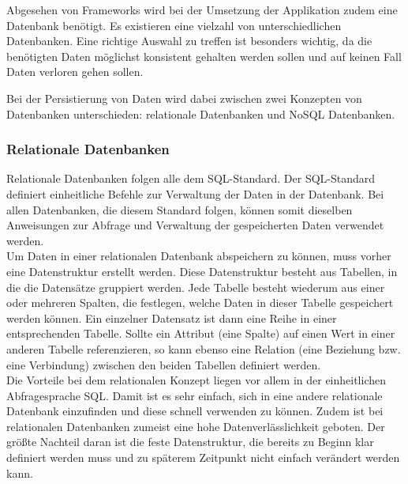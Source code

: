
Abgesehen von Frameworks wird bei der Umsetzung der Applikation zudem eine Datenbank benötigt. Es existieren eine vielzahl von unterschiedlichen Datenbanken. Eine richtige Auswahl zu treffen ist besonders wichtig, da die benötigten Daten möglichst konsistent gehalten werden sollen und auf keinen Fall Daten verloren gehen sollen. 

Bei der Persistierung von Daten wird dabei zwischen zwei Konzepten von Datenbanken unterschieden: relationale Datenbanken und NoSQL Datenbanken. \cite{DATENRELNOSQL}

\subsubsection{Relationale Datenbanken}
Relationale Datenbanken folgen alle dem SQL-Standard. Der SQL-Standard definiert einheitliche Befehle zur Verwaltung der Daten in der Datenbank. Bei allen Datenbanken, die diesem Standard folgen, können somit dieselben Anweisungen zur Abfrage und Verwaltung der gespeicherten Daten verwendet werden. \\
Um Daten in einer relationalen Datenbank abspeichern zu können, muss vorher eine Datenstruktur erstellt werden. Diese Datenstruktur besteht aus Tabellen, in die die Datensätze gruppiert werden. Jede Tabelle besteht wiederum aus einer oder mehreren Spalten, die festlegen, welche Daten in dieser Tabelle gespeichert werden können. Ein einzelner Datensatz ist dann eine Reihe in einer entsprechenden Tabelle. Sollte ein Attribut (eine Spalte) auf einen Wert in einer anderen Tabelle referenzieren, so kann ebenso eine Relation (eine Beziehung bzw. eine Verbindung) zwischen den beiden Tabellen definiert werden.\\
Die Vorteile bei dem relationalen Konzept liegen vor allem in der einheitlichen Abfragesprache SQL. Damit ist es sehr einfach, sich in eine andere relationale Datenbank einzufinden und diese schnell verwenden zu können. Zudem ist bei relationalen Datenbanken zumeist eine hohe Datenverlässlichkeit geboten. Der größte Nachteil daran ist die feste Datenstruktur, die bereits zu Beginn klar definiert werden muss und zu späterem Zeitpunkt nicht einfach verändert werden kann. \cite{DATENRELNOSQL}

\newpage

